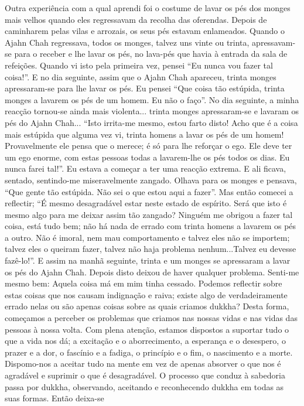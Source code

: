 Outra experiência com a qual aprendi foi o costume de
lavar os pés dos monges mais velhos quando eles regressavam da recolha das oferendas. Depois de caminharem pelas
vilas e arrozais, os seus pés estavam enlameados. Quando o
Ajahn Chah regressava, todos os monges, talvez uns vinte ou
trinta, apressavam-se para o receber e lhe lavar os pés, no
lava-pés que havia à entrada da sala de refeições. Quando vi
isto pela primeira vez, pensei “Eu nunca vou fazer tal coisa!”.
E no dia seguinte, assim que o Ajahn Chah apareceu, trinta
monges apressaram-se para lhe lavar os pés. Eu pensei “Que
coisa tão estúpida, trinta monges a lavarem os pés de um
homem. Eu não o faço”. No dia seguinte, a minha reacção
tornou-se ainda mais violenta... trinta monges apressaram-se
e lavaram os pés do Ajahn Chah... “Isto irrita-me mesmo,
estou farto disto! Acho que é a coisa mais estúpida que alguma
vez vi, trinta homens a lavar os pés de um homem!
Provavelmente ele pensa que o merece; é só para lhe reforçar
o ego. Ele deve ter um ego enorme, com estas pessoas todas
a lavarem-lhe os pés todos os dias. Eu nunca farei tal!”.
Eu estava a começar a ter uma reacção extrema. E ali
ficava, sentado, sentindo-me miseravelmente zangado.
Olhava para os monges e pensava, “Que gente tão estúpida.
Não sei o que estou aqui a fazer”.
Mas então comecei a reflectir; “É mesmo desagradável
estar neste estado de espírito. Será que isto é mesmo algo para
me deixar assim tão zangado? Ninguém me obrigou a fazer
tal coisa, está tudo bem; não há nada de errado com trinta
homens a lavarem os pés a outro. Não é imoral, nem mau
comportamento e talvez eles não se importem; talvez eles o
queiram fazer, talvez não haja problema nenhum...Talvez eu
devesse fazê-lo!”. E assim na manhã seguinte, trinta e um
monges se apressaram a lavar os pés do Ajahn Chah. Depois
disto deixou de haver qualquer problema. Senti-me mesmo
bem: Aquela coisa má em mim tinha cessado.
Podemos reflectir sobre estas coisas que nos causam
indignação e raiva; existe algo de verdadeiramente errado
nelas ou são apenas coisas sobre as quais criamos dukkha?
Desta forma, começamos a perceber os problemas que criamos nas nossas vidas e nas vidas das pessoas à nossa volta.
Com plena atenção, estamos dispostos a suportar tudo o
que a vida nos dá; a excitação e o aborrecimento, a esperança
e o desespero, o prazer e a dor, o fascínio e a fadiga, o princípio
e o fim, o nascimento e a morte. Dispomo-nos a aceitar tudo
na mente em vez de apenas absorver o que nos é agradável
e suprimir o que é desagradável. O processo que conduz à
sabedoria passa por dukkha, observando, aceitando e reconhecendo dukkha em todas as suas formas. Então deixa-se
